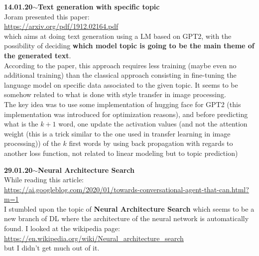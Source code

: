 \documentclass[11pt,a4paper]{article}
\newenvironment{loggentry}[2]%
{\noindent\textbf{#1}\hspace{1cm}$\mathbf{\sim}$\text{ }\textbf{#2}\\}{\vspace{0.5cm}}
\begin{document}
\begin{loggentry}{14.01.20}{Text generation with specific topic}

Joram presented this paper:\\
\url{https://arxiv.org/pdf/1912.02164.pdf}\\
which aims at doing text generation using a LM based on GPT2, with the possibility of deciding \textbf{which model topic is going to be the main theme of the generated text}.\\
According to the paper, this approach requires less training (maybe even no additional training) than the classical approach consisting in fine-tuning the language model on specific data associated to the given topic. It seems to be somehow related to what is done with style transfer in image processing.\\
The key idea was to use some implementation of hugging face for GPT2 (this implementation was introduced for optimization reasons), and before predicting what is the $k+1$ word, one update the activation values (and not the attention weight (this is a trick similar to the one used in transfer learning in image processing)) of the $k$ first words by using back propagation with regards to another loss function, not related to linear modeling but to topic prediction)

\end{loggentry}


\begin{loggentry}{29.01.20}{Neural Architecture Search}

While reading this article:\\
\url{https://ai.googleblog.com/2020/01/towards-conversational-agent-that-can.html?m=1}\\
I stumbled upon the topic of \textbf{Neural Architecture Search} which seems to be a new branch of DL where the architecture of the neural network is automatically found. I looked at the wikipedia page:\\
\url{https://en.wikipedia.org/wiki/Neural_architecture_search}\\
but I didn't get much out of it.

\end{loggentry}
\end{document}
